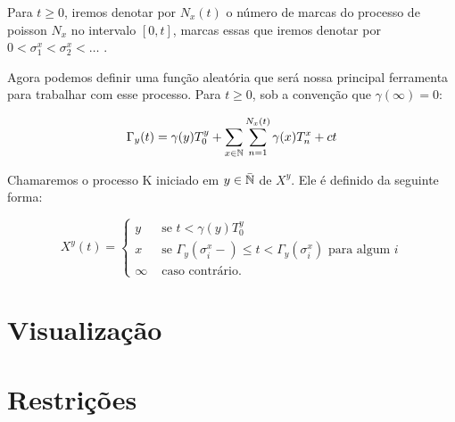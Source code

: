 Para $t \geq 0$, iremos denotar por $N_x(t)$ o número de marcas do
processo de poisson  $N_x$ no intervalo $[0, t]$, marcas essas que
iremos denotar por $0 < \sigma_1^x < \sigma_2^x < \ldots$ .

Agora podemos definir uma função aleatória que será nossa principal
ferramenta para trabalhar com esse processo. Para $t \geq 0$, sob a
convenção que $\gamma(\infty) = 0$:

\begin{equation}
  \Gamma_y (t) = \gamma(y) T_0^y
  + \sum_{x \in {\mathbb{N}}} \sum_{n = 1}^{N_x(t)}
  \gamma(x) T_n^x
  + ct
\end{equation}

Chamaremos o processo K iniciado em $y \in {\bar{{\mathbb{N}}}}$ de $X^y$. Ele é definido
da seguinte forma:

\begin{equation}
  X^y (t) =
  \begin{cases}
    y & \textrm{ se }  t < \gamma(y) T_0^y\\
    x & \textrm{ se }  \Gamma_y(\sigma_i^x-) \leq t < \Gamma_y(\sigma^x_i)
       \textrm{ para algum } i \\
    \infty & \textrm{ caso contrário.}
  \end{cases}
\end{equation}


\section{Visualização}



\section{Restrições}



